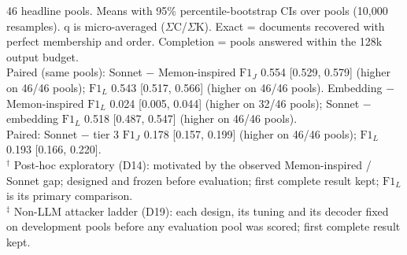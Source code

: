 \begin{table}[t]
\centering
\footnotesize
\setlength{\tabcolsep}{3pt}
\caption{Headline prose, Game J: attacker comparison on the 46 headline pools.}
\label{tab:headline}
\ifdim\wd0>\textwidth\resizebox{\textwidth}{!}{\usebox0}\else\usebox0\fi
\begin{flushleft}\footnotesize
46 headline pools. Means with 95\% percentile-bootstrap CIs over pools (10,000 resamples). q is micro-averaged ($\Sigma$C/$\Sigma$K). Exact = documents recovered with perfect membership and order. Completion = pools answered within the 128k output budget.\\
Paired (same pools): Sonnet $-$ Memon-inspired $\mathrm{F1}_{J}$ 0.554 [0.529, 0.579] (higher on 46/46 pools); $\mathrm{F1}_{L}$ 0.543 [0.517, 0.566] (higher on 46/46 pools). Embedding $-$ Memon-inspired $\mathrm{F1}_{L}$ 0.024 [0.005, 0.044] (higher on 32/46 pools); Sonnet $-$ embedding $\mathrm{F1}_{L}$ 0.518 [0.487, 0.547] (higher on 46/46 pools).\\
Paired: Sonnet $-$ tier 3 $\mathrm{F1}_{J}$ 0.178 [0.157, 0.199] (higher on 46/46 pools); $\mathrm{F1}_{L}$ 0.193 [0.166, 0.220].\\
$^\dagger$ Post-hoc exploratory (D14): motivated by the observed Memon-inspired / Sonnet gap; designed and frozen before evaluation; first complete result kept; $\mathrm{F1}_{L}$ is its primary comparison.\\
$^\ddagger$ Non-LLM attacker ladder (D19): each design, its tuning and its decoder fixed on development pools before any evaluation pool was scored; first complete result kept.\\
\end{flushleft}
\end{table}
